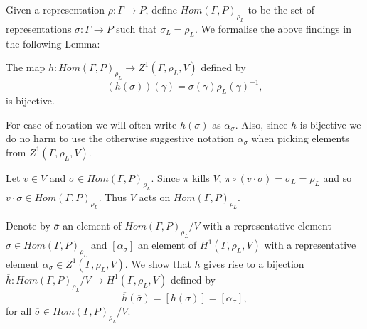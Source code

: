Given a representation $\rho:\Gamma\rightarrow P$, define $Hom(\Gamma, P)_{\rho_L}$ to be the set of representations $\sigma:\Gamma\rightarrow P$ such that $\sigma_L = \rho_L$. We formalise the above findings in the following Lemma:

\begin{lemma}
  The map $h:Hom(\Gamma, P)_{\rho_L} \rightarrow Z^1(\Gamma, \rho_L, V)$ defined by
  \begin{displaymath}
    (h(\sigma))(\gamma) = \sigma(\gamma)\rho_L(\gamma)^{-1},
  \end{displaymath}
  is bijective.
  \label{lem:hom_z1}
\end{lemma}

For ease of notation we will often write $h(\sigma)$ as $\alpha_\sigma$. Also, since $h$ is bijective we do no harm to use the otherwise suggestive notation $\alpha_\sigma$ when picking elements from $Z^1(\Gamma, \rho_L, V)$.

Let $v \in V$ and $\sigma \in Hom(\Gamma, P)_{\rho_L}$. Since $\pi$ kills $V$, $\pi \circ (v \cdot \sigma) = \sigma_L = \rho_L$ and so $v \cdot \sigma \in Hom(\Gamma, P)_{\rho_L}$. Thus $V$ acts on $Hom(\Gamma, P)_{\rho_L}$.

Denote by $\overline{\sigma}$ an element of $Hom(\Gamma, P)_{\rho_L}/V$ with a representative element $\sigma \in Hom(\Gamma, P)_{\rho_L}$ and $[\alpha_\sigma]$ an element of $H^1(\Gamma, \rho_L, V)$ with a representative element $\alpha_\sigma \in Z^1(\Gamma, \rho_L, V)$. We show that $h$ gives rise to a bijection $\overline{h}: Hom(\Gamma,P)_{\rho_L}/V\rightarrow H^{1}(\Gamma, \rho_L, V)$ defined by
\begin{displaymath}
  \overline{h}(\overline{\sigma}) = [h(\sigma)] = [\alpha_\sigma],
\end{displaymath}
for all $\overline{\sigma} \in Hom(\Gamma, P)_{\rho_L}/V$.

